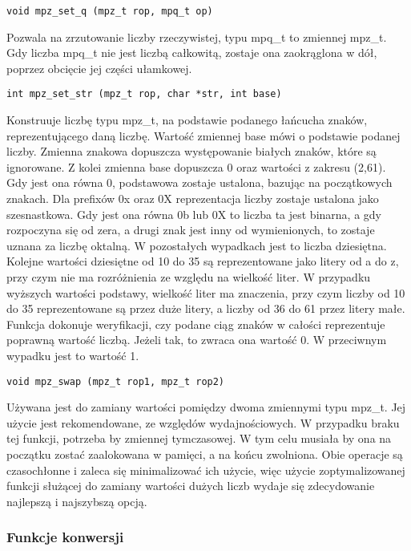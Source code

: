 \documentclass[twoside,a4paper]{book}
\begin{document}
\begin{lstlisting}
void mpz_set_q (mpz_t rop, mpq_t op)
\end{lstlisting}
Pozwala na zrzutowanie liczby rzeczywistej, typu mpq\_t to zmiennej mpz\_t. Gdy liczba mpq\_t nie jest liczbą całkowitą, zostaje ona zaokrąglona w dół, poprzez obcięcie jej części ułamkowej.

\begin{lstlisting}
int mpz_set_str (mpz_t rop, char *str, int base)
\end{lstlisting}
Konstruuje liczbę typu mpz\_t, na podstawie podanego łańcucha znaków, reprezentującego daną liczbę. Wartość zmiennej base mówi o podstawie podanej liczby. Zmienna znakowa dopuszcza występowanie białych znaków, które są ignorowane. Z kolei zmienna base dopuszcza 0 oraz wartości z zakresu (2,61). Gdy jest ona równa 0, podstawowa zostaje ustalona, bazując na początkowych znakach. Dla prefixów 0x oraz 0X reprezentacja liczby zostaje ustalona jako szesnastkowa. Gdy jest ona równa 0b lub 0X to liczba ta jest binarna, a gdy rozpoczyna się od zera, a drugi znak jest inny od wymienionych, to zostaje uznana za liczbę oktalną. W pozostałych wypadkach jest to liczba dziesiętna. Kolejne wartości dziesiętne od 10 do 35 są reprezentowane jako litery od a do z, przy czym nie ma rozróżnienia ze względu na wielkość liter. W przypadku wyższych wartości podstawy, wielkość liter ma znaczenia, przy czym liczby od 10 do 35 reprezentowane są przez duże litery, a liczby od 36 do 61 przez litery małe. Funkcja dokonuje weryfikacji, czy podane ciąg znaków w całości reprezentuje poprawną wartość liczbą. Jeżeli tak, to zwraca ona wartość 0. W przeciwnym wypadku jest to wartość 1.

\begin{lstlisting}
void mpz_swap (mpz_t rop1, mpz_t rop2)
\end{lstlisting}
Używana jest do zamiany wartości pomiędzy dwoma zmiennymi typu mpz\_t. Jej użycie jest rekomendowane, ze względów wydajnościowych. W przypadku braku tej funkcji, potrzeba by zmiennej tymczasowej. W tym celu musiała by ona na początku zostać zaalokowana w pamięci, a na końcu zwolniona. Obie operacje są czasochłonne i zaleca się minimalizować ich użycie, więc użycie zoptymalizowanej funkcji służącej do zamiany wartości dużych liczb wydaje się zdecydowanie najlepszą i najszybszą opcją.

\subsubsection{Funkcje konwersji}
\end{document}
